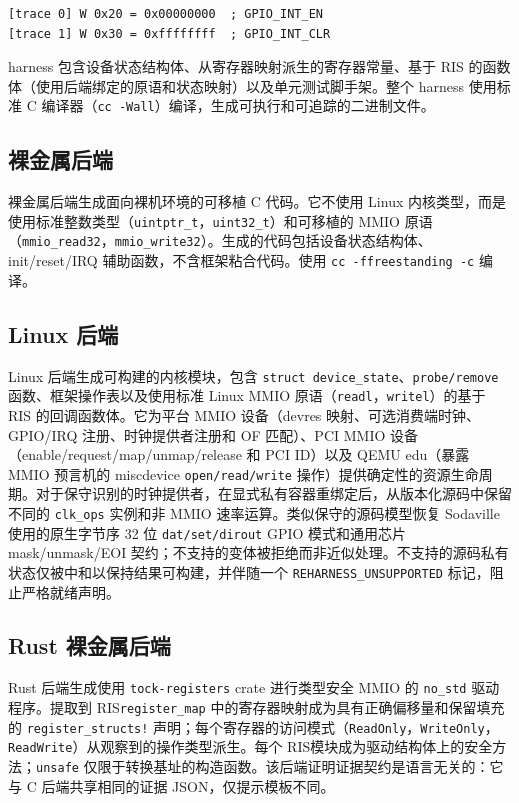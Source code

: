 \documentclass[sigplan, screen, review, anonymous]{acmart}
\newcommand{\rislang}{RIS}
\begin{document}
\begin{lstlisting}
[trace 0] W 0x20 = 0x00000000  ; GPIO_INT_EN
[trace 1] W 0x30 = 0xffffffff  ; GPIO_INT_CLR
\end{lstlisting}

harness 包含设备状态结构体、从寄存器映射派生的寄存器常量、基于 RIS 的函数体（使用后端绑定的原语和状态映射）以及单元测试脚手架。整个 harness 使用标准 C 编译器（\texttt{cc -Wall}）编译，生成可执行和可追踪的二进制文件。

\subsection{裸金属后端}

裸金属后端生成面向裸机环境的可移植 C 代码。它不使用 Linux 内核类型，而是使用标准整数类型（\texttt{uintptr\_t}，\texttt{uint32\_t}）和可移植的 MMIO 原语（\texttt{mmio\_read32}，\texttt{mmio\_write32}）。生成的代码包括设备状态结构体、init/reset/IRQ 辅助函数，不含框架粘合代码。使用 \texttt{cc -ffreestanding -c} 编译。

\subsection{Linux 后端}

Linux 后端生成可构建的内核模块，包含 \texttt{struct device\_state}、\texttt{probe/remove} 函数、框架操作表以及使用标准 Linux MMIO 原语（\texttt{readl}，\texttt{writel}）的基于 RIS 的回调函数体。它为平台 MMIO 设备（devres 映射、可选消费端时钟、GPIO/IRQ 注册、时钟提供者注册和 OF 匹配）、PCI MMIO 设备（enable/request/map/unmap/release 和 PCI ID）以及 QEMU edu（暴露 MMIO 预言机的 miscdevice \texttt{open/read/write} 操作）提供确定性的资源生命周期。对于保守识别的时钟提供者，在显式私有容器重绑定后，从版本化源码中保留不同的 \texttt{clk\_ops} 实例和非 MMIO 速率运算。类似保守的源码模型恢复 Sodaville 使用的原生字节序 32 位 \texttt{dat/set/dirout} GPIO 模式和通用芯片 mask/unmask/EOI 契约；不支持的变体被拒绝而非近似处理。不支持的源码私有状态仅被中和以保持结果可构建，并伴随一个 \texttt{REHARNESS\_UNSUPPORTED} 标记，阻止严格就绪声明。

\subsection{Rust 裸金属后端}

Rust 后端生成使用 \texttt{tock-registers} crate 进行类型安全 MMIO 的 \texttt{no\_std} 驱动程序。提取到 \rislang \texttt{register\_map} 中的寄存器映射成为具有正确偏移量和保留填充的 \texttt{register\_structs!} 声明；每个寄存器的访问模式（\texttt{ReadOnly}，\texttt{WriteOnly}，\texttt{ReadWrite}）从观察到的操作类型派生。每个 \rislang 模块成为驱动结构体上的安全方法；\texttt{unsafe} 仅限于转换基址的构造函数。该后端证明证据契约是语言无关的：它与 C 后端共享相同的证据 JSON，仅提示模板不同。
\end{document}
